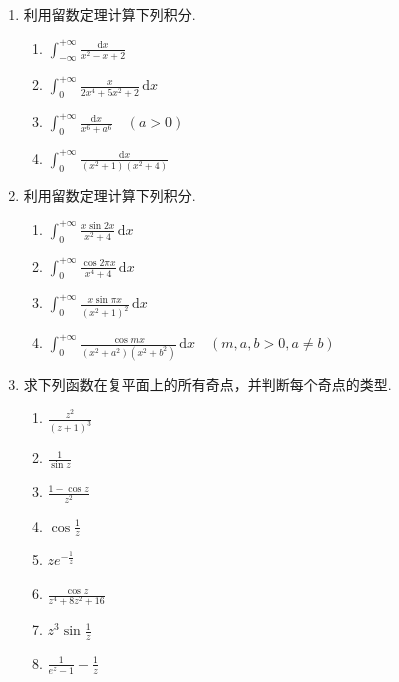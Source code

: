 \documentclass[openany,oneside]{ctexbook}
\begin{document}
\begin{enumerate}[label=\arabic*., start=1]
\item 利用留数定理计算下列积分.
\begin{enumerate}[label=(\arabic*)]
\item \(\displaystyle \int_{-\infty}^{+\infty} \frac{\mathrm{d}x}{x^2-x+2}\)
\item \(\displaystyle \int_0^{+\infty} \frac{x}{2x^4+5x^2+2} \, \mathrm{d}x\)
\item \(\displaystyle \int_0^{+\infty} \frac{\mathrm{d}x}{x^6+a^6} \quad (a>0)\)
\item \(\displaystyle \int_0^{+\infty} \frac{\mathrm{d}x}{(x^2+1)(x^2+4)}\)
\end{enumerate}

\item 利用留数定理计算下列积分.
\begin{enumerate}[label=(\arabic*)]
\item \(\displaystyle \int_0^{+\infty} \frac{x \sin 2x}{x^2+4} \, \mathrm{d}x\)
\item \(\displaystyle \int_0^{+\infty} \frac{\cos 2\pi x}{x^4+4} \, \mathrm{d}x\)
\item \(\displaystyle \int_0^{+\infty} \frac{x \sin \pi x}{(x^2+1)^2} \, \mathrm{d}x\)
\item \(\displaystyle \int_0^{+\infty} \frac{\cos mx}{(x^2+a^2)(x^2+b^2)} \, \mathrm{d}x \quad (m, a, b>0, a \neq b)\)
\end{enumerate}

\item 求下列函数在复平面上的所有奇点，并判断每个奇点的类型.
\begin{enumerate}[label=(\arabic*)]
\item \(\displaystyle \frac{z^2}{(z+1)^3}\)
\item \(\displaystyle \frac{1}{\sin z}\)
\item \(\displaystyle \frac{1 - \cos z}{z^2}\)
\item \(\displaystyle \cos \frac{1}{z}\)
\item \(\displaystyle z e^{-\frac{1}{z}}\)
\item \(\displaystyle \frac{\cos z}{z^4 + 8z^2 + 16}\)
\item \(\displaystyle z^3 \sin \frac{1}{z}\)
\item \(\displaystyle \frac{1}{e^z - 1} - \frac{1}{z}\)
\end{enumerate}
\end{enumerate}
\end{document}
